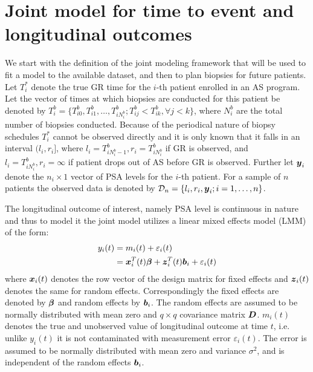 
\section{Joint model for time to event and longitudinal outcomes}
\label{sec : jm_framework}
We start with the definition of the joint modeling framework that will be used to fit a model to the available dataset, and then to plan biopsies for future patients. Let $T_i^*$ denote the true GR time for the $i$-th patient enrolled in an AS program. Let the vector of times at which biopsies are conducted for this patient be denoted by $T_i^b = \{T^b_{i0}, T^b_{i1}, \ldots, T^b_{i{N_i^b}}; T^b_{ij} < T^b_{ik}, \forall j<k\}$, where $N_i^b$ are the total number of biopsies conducted. Because of the periodical nature of biopsy schedules $T_i^*$ cannot be observed directly and it is only known that it falls in an interval $(l_i, r_i]$, where $l_i = T^b_{i{N_i^b - 1}}, r_i = T^b_{i{N_i^b}}$ if GR is observed, and $l_i = T^b_{i{N_i^b}}, r_i=\infty$ if patient drops out of AS before GR is observed. Further let $\boldsymbol{y}_i$ denote the $n_i \times 1$  vector of PSA levels for the $i$-th patient. For a sample of $n$ patients the observed data is denoted by $\mathcal{D}_n = \{l_i, r_i, \boldsymbol{y}_i; i = 1, \ldots, n\}$.

The longitudinal outcome of interest, namely PSA level is continuous in nature and thus to model it the joint model utilizes a linear mixed effects model (LMM) of the form:
\begin{equation*}
\begin{split}
y_i(t) &= m_i(t) + \varepsilon_i(t)\\
&=\boldsymbol{x}_i^T(t) \boldsymbol{\beta} + \boldsymbol{z}_i^T(t) \boldsymbol{b}_i + \varepsilon_i(t)
\end{split}
\end{equation*}
where $\boldsymbol{x}_i(t)$ denotes the row vector of the design matrix for fixed effects and $\boldsymbol{z}_i(t)$ denotes the same for random effects. Correspondingly the fixed effects are denoted by $\boldsymbol{\beta}$ and random effects by $\boldsymbol{b}_i$. The random effects are assumed to be normally distributed with mean zero and $q \times q$ covariance matrix $\boldsymbol{D}$. $m_i(t)$ denotes the true and unobserved value of longitudinal outcome at time $t$, i.e. unlike $y_i(t)$ it is not contaminated with measurement error $\varepsilon_i(t)$. The error is assumed to be normally distributed with mean zero and variance $\sigma^2$, and is independent of the random effects $\boldsymbol{b}_i$.

